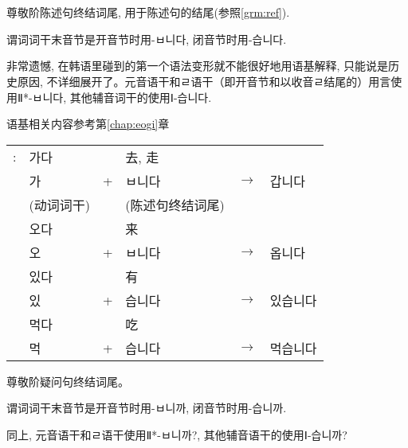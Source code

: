 \section{\kr{}}
\begin{grammar}
	\begin{grammarsect}
		\begin{itemize}
			\item 尊敬阶陈述句终结词尾, 用于陈述句的结尾(参照\ref{grm:ref}).
			\item 谓词词干末音节是开音节时用{\kr -ㅂ니다}, 闭音节时用{\kr -습니다.}
			      {\color{gray} \item 非常遗憾, 在韩语里碰到的第一个语法变形就不能很好地用语基解释, 只能说是历史原因, 不详细展开了。元音语干和ㄹ语干（即开音节和以收音ㄹ结尾的）用言使用Ⅱ*{\kr -ㅂ니다}, 其他辅音词干的使用Ⅰ{\kr -습니다.}}语基相关内容参考第\ref{chap:eogi}章
		\end{itemize}
		\begin{tabular}{llllll}
			\kr \ruby{例}{예}: & \kr 가다 &   & 去, 走                         \\
                            & \kr 가  & + & \kr ㅂ니다   & $\to$ & \kr 갑니다  \\
                            & (动词词干) &   & (陈述句终结词尾)                    \\
                            & \kr 오다 &   & 来                            \\
                            & \kr 오  & + & \kr ㅂ니다   & $\to$ & \kr 옵니다  \\
                            & \kr 있다 &   & 有                            \\
                            & \kr 있  & + & \kr 습니다   & $\to$ & \kr 있습니다 \\
                            & \kr 먹다 &   & 吃                            \\
                            & \kr 먹  & + & \kr 습니다   & $\to$ & \kr 먹습니다 \\
		\end{tabular}
	\end{grammarsect}
	\begin{grammarsect}
		\begin{itemize}
			\item 尊敬阶疑问句终结词尾。
			\item 谓词词干末音节是开音节时用-ㅂ니까, 闭音节时用-습니까.
			      {\color{gray} \item 同上, 元音语干和ㄹ语干使用Ⅱ*{\kr -ㅂ니까?}, 其他辅音语干的使用Ⅰ{\kr -습니까?}}

\end{itemize}
\end{grammarsect}
\end{grammar}
